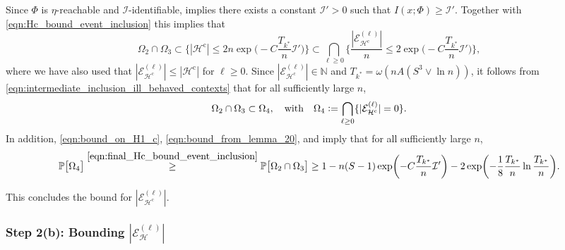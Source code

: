 \documentclass[11pt]{article}
\newcommand{\eqdef}{\vcentcolon=}
\newcommand{\mc}[1]{\mathcal{#1}}
\newcommand{\mcE}{\mathcal{E}}
\newcommand{\mcH}{\mathcal{H}}
\newcommand{\mcI}{\mathcal{I}}
\newcommand{\mbbP}{\mathbb{P}}
\newcommand{\mbbN}{\mathbb{N}}
\theoremstyle{definition}
\theoremstyle{definition}
\begin{document}
Since $\Phi$ is $\eta$-reachable and $\mcI$-identifiable,  implies there exists a constant $\mc{I}'>0$ such that $I(x;\Phi)\geq \mcI'$.
Together with \eqref{eqn:Hc_bound_event_inclusion} this implies that
\begin{equation}
	\label{eqn:intermediate_inclusion_ill_behaved_contexts}
	\Omega_2\cap\Omega_3
	\subset
	\biggl\{
	|\mcH^{\mathrm{c}}|
	\leq
	2n\exp\biggl(-C\frac{T_{k^*}}{n}\mcI'\biggr)
	\biggr\}
	\subset
	\bigcap_{\ell\geq 0}
	\biggl\{
	\frac{|\mcE^{(\ell)}_{\mcH^{\mathrm{c}}}|}{n}
	\leq
	2\exp\biggl(-C\frac{T_{k^*}}{n}\mcI'\biggr)
	\biggr\}
	,
\end{equation}
where we have also used that $|\mcE_{\mcH^{\mathrm{c}}}^{(\ell)}|\leq|\mcH^{\mathrm{c}}|$ for $\ell\geq 0$.
Since $|\mcE^{(\ell)}_{\mcH^{\mathrm{c}}}|\in\mbbN$ and $T_{k^*}=\omega(nA(S^3\vee \ln n))$, it follows from \eqref{eqn:intermediate_inclusion_ill_behaved_contexts} that for all sufficiently large $n$,
\begin{equation}
	\label{eqn:final_Hc_bound_event_inclusion}
	\Omega_2\cap\Omega_3
	\subset
	\Omega_4
	,
	\quad
	\mathrm{with}
	\quad
	\Omega_4
	\eqdef
	\bigcap_{\ell\geq 0}\{|\mcE^{(\ell)}_{\mcH^{\mathrm{c}}}| = 0\}
	.
\end{equation}
In addition, \eqref{eqn:bound_on_H1_c}, \eqref{eqn:bound_from_lemma_20}, and  imply that for all sufficiently large $n$,
\begin{equation}
	\label{eqn:bound_illbehaved_contexts}
	\begin{split}
		\mbbP\bigl[
			\Omega_4
			\bigr]
		\overset{\eqref{eqn:final_Hc_bound_event_inclusion}}{\geq}
		\mbbP\bigl[
			\Omega_2\cap\Omega_3
			\bigr]
		\geq
		1
		-
		n(S-1)\exp\biggl(-C\frac{T_{k^*}}{n}\mcI'\biggr)
		-
		2\exp\biggl(-\frac{1}{8}\frac{T_{k^*}}{n}\ln \frac{T_{k^*}}{n}\biggr)
		.
	\end{split}
\end{equation}

This concludes the bound for $|\mcE_{\mcH^{\mathrm{c}}}^{(\ell)}|$.

\subsubsection*{Step 2(b): Bounding $|\mcE_{\mcH}^{(\ell)}|$}
\end{document}
